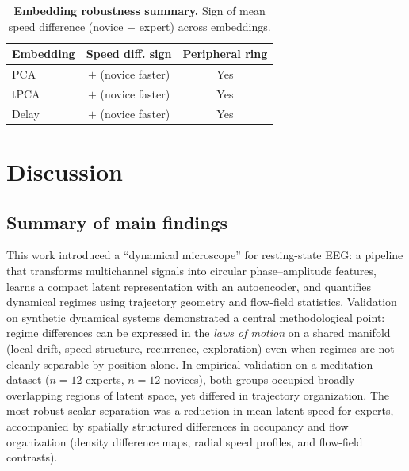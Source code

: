 \documentclass[5p,twocolumn,authoryear]{elsarticle}
\begin{document}
\begin{table}[h]
\centering
\caption{\textbf{Embedding robustness summary.} Sign of mean speed difference (novice $-$ expert) across embeddings.}
\label{tab:embedding_robustness}
\begin{tabular}{lcc}
\toprule
Embedding & Speed diff. sign & Peripheral ring \\
\midrule
PCA & $+$ (novice faster) & Yes \\
tPCA & $+$ (novice faster) & Yes \\
Delay & $+$ (novice faster) & Yes \\
\bottomrule
\end{tabular}
\end{table}


\section{Discussion}
\label{sec:discussion}

\subsection{Summary of main findings}
This work introduced a ``dynamical microscope'' for resting-state EEG: a pipeline that transforms multichannel signals into circular phase--amplitude features, learns a compact latent representation with an autoencoder, and quantifies dynamical regimes using trajectory geometry and flow-field statistics. Validation on synthetic dynamical systems demonstrated a central methodological point: regime differences can be expressed in the \emph{laws of motion} on a shared manifold (local drift, speed structure, recurrence, exploration) even when regimes are not cleanly separable by position alone. In empirical validation on a meditation dataset ($n=12$ experts, $n=12$ novices), both groups occupied broadly overlapping regions of latent space, yet differed in trajectory organization. The most robust scalar separation was a reduction in mean latent speed for experts, accompanied by spatially structured differences in occupancy and flow organization (density difference maps, radial speed profiles, and flow-field contrasts).
\end{document}
